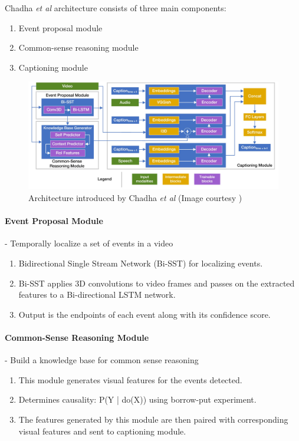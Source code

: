 \par Chadha \textit{et al} architecture consists of three main components:
\begin{enumerate}
	\item Event proposal module
	\item Common-sense reasoning module
	\item Captioning module
\end{enumerate}

\begin{figure}[h]
	\includegraphics[width=\linewidth]{assets/img/chadha2020iperceive-architecture.png}
	\caption{Architecture introduced by Chadha \textit{et al} (Image courtesy \cite{chadha2020iperceive})}
\end{figure}

\paragraph{Event Proposal Module} - Temporally localize a set of events in a video
\begin{enumerate}
	\item Bidirectional Single Stream Network (Bi-SST)\cite{wang2018bidirectional} for localizing events.
	\item Bi-SST applies 3D convolutions to video frames and passes on the extracted features to a Bi-directional LSTM network.
	\item Output is the endpoints of each event along with its confidence score.
\end{enumerate}

\paragraph{Common-Sense Reasoning Module} - Build a knowledge base for common sense reasoning
\begin{enumerate}
	\item This module generates visual features for the events detected.
	\item Determines causality: P(Y | do(X)) using borrow-put experiment.
	\item The features generated by this module are then paired with corresponding visual features and sent to captioning module.
\end{enumerate}

